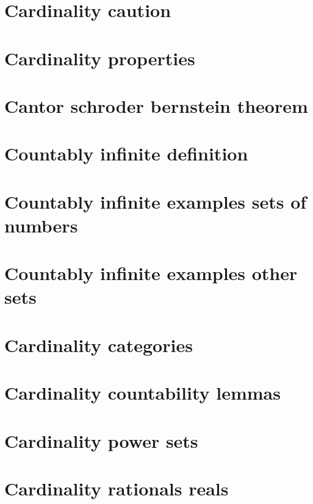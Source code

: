 \section*{Cardinality caution}

\vfill
\section*{Cardinality properties}

\vfill
\section*{Cantor schroder bernstein theorem}

\vfill
\section*{Countably infinite definition}

\vfill
\section*{Countably infinite examples sets of numbers}

\vfill
\section*{Countably infinite examples other sets}

\vfill
\section*{Cardinality categories}

\vfill
\section*{Cardinality countability lemmas}

\vfill
\section*{Cardinality power sets}

\vfill
\section*{Cardinality rationals reals}

\vfill
